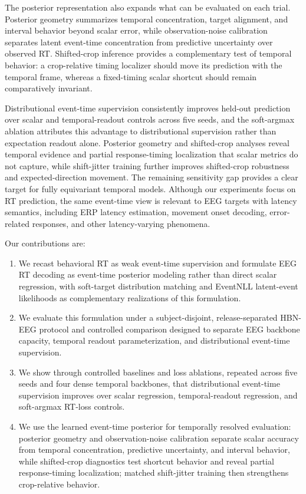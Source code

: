 \documentclass[12pt]{article}
\begin{document}
The posterior representation also expands what can be evaluated on each trial. Posterior geometry summarizes temporal concentration, target alignment, and interval behavior beyond scalar error, while observation-noise calibration separates latent event-time concentration from predictive uncertainty over observed RT. Shifted-crop inference provides a complementary test of temporal behavior: a crop-relative timing localizer should move its prediction with the temporal frame, whereas a fixed-timing scalar shortcut should remain comparatively invariant.

Distributional event-time supervision consistently improves held-out prediction over scalar and temporal-readout controls across five seeds, and the soft-argmax ablation attributes this advantage to distributional supervision rather than expectation readout alone. Posterior geometry and shifted-crop analyses reveal temporal evidence and partial response-timing localization that scalar metrics do not capture, while shift-jitter training further improves shifted-crop robustness and expected-direction movement. The remaining sensitivity gap provides a clear target for fully equivariant temporal models. Although our experiments focus on RT prediction, the same event-time view is relevant to EEG targets with latency semantics, including ERP latency estimation, movement onset decoding, error-related responses, and other latency-varying phenomena.

Our contributions are:
\begin{enumerate}
    \item We recast behavioral RT as weak event-time supervision and formulate EEG RT decoding as event-time posterior modeling rather than direct scalar regression, with soft-target distribution matching and EventNLL latent-event likelihoods as complementary realizations of this formulation.
    \item We evaluate this formulation under a subject-disjoint, release-separated HBN-EEG protocol and controlled comparison designed to separate EEG backbone capacity, temporal readout parameterization, and distributional event-time supervision.
    \item We show through controlled baselines and loss ablations, repeated across five seeds and four dense temporal backbones, that distributional event-time supervision improves over scalar regression, temporal-readout regression, and soft-argmax RT-loss controls.
    \item We use the learned event-time posterior for temporally resolved evaluation: posterior geometry and observation-noise calibration separate scalar accuracy from temporal concentration, predictive uncertainty, and interval behavior, while shifted-crop diagnostics test shortcut behavior and reveal partial response-timing localization; matched shift-jitter training then strengthens crop-relative behavior.
\end{enumerate}
\end{document}

